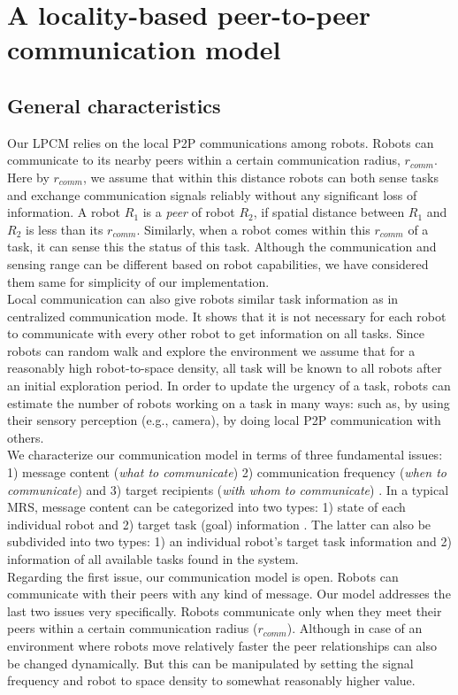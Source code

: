 \section{A locality-based peer-to-peer communication model}
\label{local-comm:model}
\subsection{General characteristics}
Our LPCM relies on the local P2P communications among robots. Robots can communicate to its nearby peers within a certain communication radius, $r_{comm}$. Here by $r_{comm}$, we assume that within this distance robots can both sense tasks and exchange communication signals reliably without any significant loss of information. A robot $R_1$ is a {\em peer} of robot $R_2$, if spatial distance between $R_1$ and $R_2$ is less than its $r_{comm}$.
Similarly, when a robot comes within this $r_{comm}$ of a task, it can sense this the status of this task. Although the communication and sensing  range can be different based on robot capabilities, we have considered them same for simplicity of our implementation.\\
Local communication can also give robots similar task information as in centralized communication mode. It shows that it is not necessary for each robot to communicate with every other robot to get information on all tasks. Since robots can random walk and explore the environment we assume that for a reasonably high robot-to-space density, all task will be known to all robots after an initial exploration period. In order to update the urgency of a task, robots can estimate the number of robots working on a task in many ways: such as, by using their sensory perception (e.g., camera), by doing local P2P communication with others.\\
We characterize our communication model in terms of three fundamental issues: 1) message content ({\em what to communicate}) 2) communication frequency ({\em when to communicate}) and 3) target recipients ({\em with whom to communicate}) \cite{Gerkey+2001}. In a typical MRS, message content can be categorized into two types: 1) state of each individual robot and 2) target task (goal) information \cite{Balch2005}. The latter can also be subdivided into two types: 1) an individual robot's target task information and 2) information of all available tasks found in the system.\\ 
Regarding the first issue, our communication model is open. Robots can communicate with their peers with any kind of message. Our model addresses the last two issues very specifically. Robots communicate only when they meet their peers within a certain communication radius ($r_{comm}$). Although in case of an environment where robots move relatively faster the peer relationships can also be changed dynamically. But this can be manipulated by setting the signal frequency and robot to space density to somewhat reasonably higher value.\\ 
